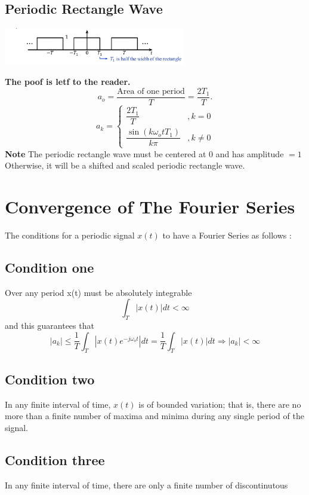 \documentclass[11pt,a4paper]{article}
\theoremstyle{definition}
\begin{document}
\subsection{Periodic Rectangle Wave }
\begin{center}
    \includegraphics[width=300px]{rectangle-wave.png}
\end{center}
\textbf{The poof is letf to the reader.}
\[
    a_o = \frac{\text{Area of one period}}{T} = \frac{2T_1}{T}.
\]
\[
    \displaystyle
    a_k = \begin{cases}
        \dfrac{2T_1}{T}& , k = 0\\
        \dfrac{\sin(k\omega_otT_1)}{k\pi} & , k \neq 0 
    \end{cases}
\]
\textbf{Note} The periodic rectangle wave must be centered at 0 and has amplitude $=1$
Otherwise, it will be a shifted and scaled periodic rectangle wave.
\section{Convergence of The Fourier Series}
The conditions for a periodic signal $x(t)$ to have a Fourier Series as follows :
\subsection{Condition one}
Over any period x(t) must be absolutely integrable 
\[
    \int_T |x(t)| dt < \infty
\]
and this guarantees that 
\[
    |a_k| \leq \frac{1}{T} \int_T |x(t) e^{-j\omega_ot}| dt = \dfrac{1}{T} 
    \int_T |x(t)| dt \Rightarrow |a_k| < \infty
\]

\subsection{Condition two}
 In any finite interval of time, $x(t)$ is of bounded 
variation; that is, there are no more than a finite number of 
maxima and minima during any single period of the signal.

\subsection{Condition three}
In any finite interval of time, there are only a finite number of discontinutous
\end{document}
